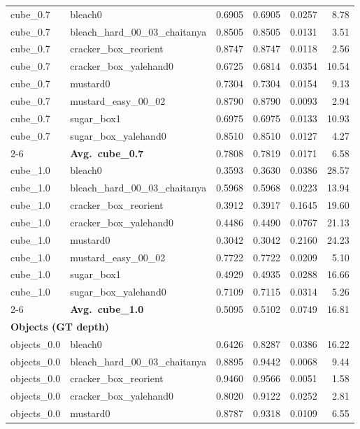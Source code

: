 \begin{longtable}{llrrrr}
  \midrule
  cube_0.7 & bleach0 & 0.6905 & 0.6905 & 0.0257 & 8.78 \\
  cube_0.7 & bleach\_hard\_00\_03\_chaitanya & 0.8505 & 0.8505 & 0.0131 & 3.51 \\
  cube_0.7 & cracker\_box\_reorient & 0.8747 & 0.8747 & 0.0118 & 2.56 \\
  cube_0.7 & cracker\_box\_yalehand0 & 0.6725 & 0.6814 & 0.0354 & 10.54 \\
  cube_0.7 & mustard0 & 0.7304 & 0.7304 & 0.0154 & 9.13 \\
  cube_0.7 & mustard\_easy\_00\_02 & 0.8790 & 0.8790 & 0.0093 & 2.94 \\
  cube_0.7 & sugar\_box1 & 0.6975 & 0.6975 & 0.0133 & 10.93 \\
  cube_0.7 & sugar\_box\_yalehand0 & 0.8510 & 0.8510 & 0.0127 & 4.27 \\
  \cmidrule{2-6}
  & \textbf{Avg.~cube_0.7} & 0.7808 & 0.7819 & 0.0171 & 6.58 \\
  \midrule
  cube_1.0 & bleach0 & 0.3593 & 0.3630 & 0.0386 & 28.57 \\
  cube_1.0 & bleach\_hard\_00\_03\_chaitanya & 0.5968 & 0.5968 & 0.0223 & 13.94 \\
  cube_1.0 & cracker\_box\_reorient & 0.3912 & 0.3917 & 0.1645 & 19.60 \\
  cube_1.0 & cracker\_box\_yalehand0 & 0.4486 & 0.4490 & 0.0767 & 21.13 \\
  cube_1.0 & mustard0 & 0.3042 & 0.3042 & 0.2160 & 24.23 \\
  cube_1.0 & mustard\_easy\_00\_02 & 0.7722 & 0.7722 & 0.0209 & 5.10 \\
  cube_1.0 & sugar\_box1 & 0.4929 & 0.4935 & 0.0288 & 16.66 \\
  cube_1.0 & sugar\_box\_yalehand0 & 0.7109 & 0.7115 & 0.0314 & 5.26 \\
  \cmidrule{2-6}
  & \textbf{Avg.~cube_1.0} & 0.5095 & 0.5102 & 0.0749 & 16.81 \\
  \midrule
\multicolumn{6}{l}{\textbf{Objects (GT depth)}} \\
\midrule
  objects_0.0 & bleach0 & 0.6426 & 0.8287 & 0.0386 & 16.22 \\
  objects_0.0 & bleach\_hard\_00\_03\_chaitanya & 0.8895 & 0.9442 & 0.0068 & 9.44 \\
  objects_0.0 & cracker\_box\_reorient & 0.9460 & 0.9566 & 0.0051 & 1.58 \\
  objects_0.0 & cracker\_box\_yalehand0 & 0.8020 & 0.9122 & 0.0252 & 2.81 \\
  objects_0.0 & mustard0 & 0.8787 & 0.9318 & 0.0109 & 6.55 \\

\end{longtable}
